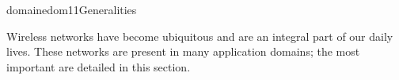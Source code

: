 \documentclass{ra2016}
\begin{document}
%
%
%
%
%






\begin{module}{domaine}{dom11}{Generalities}

Wireless networks have become ubiquitous and are an integral part of our daily lives. These networks are present in many application domains; the most important are detailed in this section.

\end{module}
\end{document}
